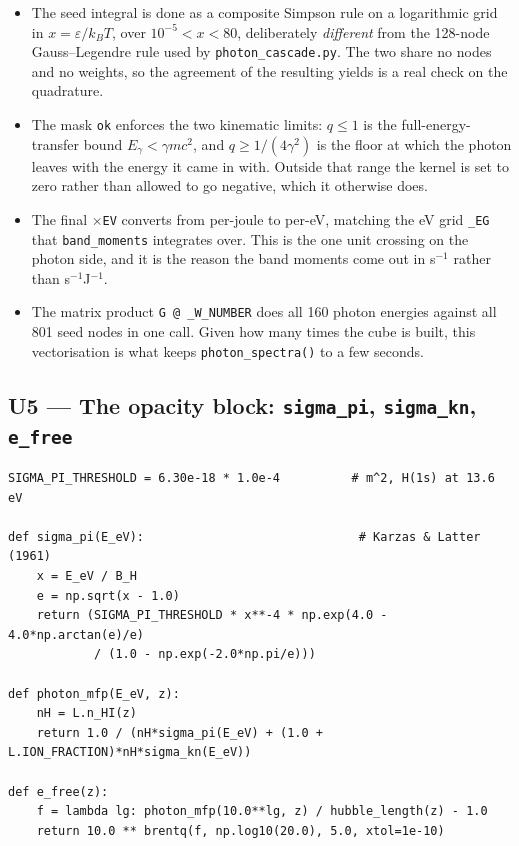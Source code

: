 \documentclass[11pt,a4paper]{article}
\newcommand{\code}[1]{\texttt{\small #1}}
\newcommand{\file}[1]{\texttt{\small #1}}
\newcommand{\eps}{\varepsilon}
\newcommand{\Eg}{E_\gamma}
\begin{document}
\begin{itemize}[leftmargin=1.3em]
\item The seed integral is done as a composite Simpson rule on a logarithmic
      grid in $x=\eps/k_BT$, over $10^{-5}<x<80$, deliberately \emph{different}
      from the 128-node Gauss--Legendre rule used by
      \file{photon\_cascade.py}.  The two share no nodes and no weights, so the
      agreement of the resulting yields is a real check on the quadrature.
\item The mask \code{ok} enforces the two kinematic limits: $q\le 1$ is the
      full-energy-transfer bound $\Eg<\gamma mc^2$, and $q\ge 1/(4\gamma^2)$ is
      the floor at which the photon leaves with the energy it came in with.
      Outside that range the kernel is set to zero rather than allowed to go
      negative, which it otherwise does.
\item The final $\times$\code{EV} converts from per-joule to per-eV, matching
      the eV grid \code{\_EG} that \code{band\_moments} integrates over.  This
      is the one unit crossing on the photon side, and it is the reason the
      band moments come out in s$^{-1}$ rather than s$^{-1}$J$^{-1}$.
\item The matrix product \code{G @ \_W\_NUMBER} does all 160 photon energies
      against all 801 seed nodes in one call.  Given how many times the cube is
      built, this vectorisation is what keeps \code{photon\_spectra()} to a few
      seconds.
\end{itemize}

\subsection*{U5 --- The opacity block: \code{sigma\_pi}, \code{sigma\_kn}, \code{e\_free}}

\begin{lstlisting}
SIGMA_PI_THRESHOLD = 6.30e-18 * 1.0e-4          # m^2, H(1s) at 13.6 eV

def sigma_pi(E_eV):                              # Karzas & Latter (1961)
    x = E_eV / B_H
    e = np.sqrt(x - 1.0)
    return (SIGMA_PI_THRESHOLD * x**-4 * np.exp(4.0 - 4.0*np.arctan(e)/e)
            / (1.0 - np.exp(-2.0*np.pi/e)))

def photon_mfp(E_eV, z):
    nH = L.n_HI(z)
    return 1.0 / (nH*sigma_pi(E_eV) + (1.0 + L.ION_FRACTION)*nH*sigma_kn(E_eV))

def e_free(z):
    f = lambda lg: photon_mfp(10.0**lg, z) / hubble_length(z) - 1.0
    return 10.0 ** brentq(f, np.log10(20.0), 5.0, xtol=1e-10)
\end{lstlisting}
\end{document}

